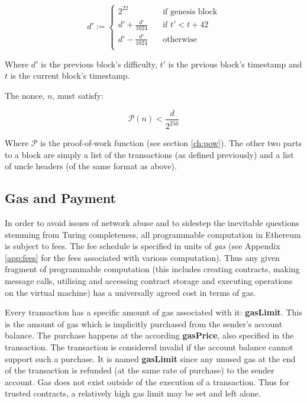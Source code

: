 \documentclass[9pt,oneside]{amsart}
\begin{document}
\begin{multicols}{2}
\begin{equation}
d' :=  \begin{cases}
2^{22} & \quad \text{if genesis block}\\
d' + \frac{d'}{1024} & \quad \text{if $t' < t + 42$}\\
d' - \frac{d'}{1024} & \quad \text{otherwise}\\
\end{cases}
\end{equation}

Where $d'$ is the previous block's difficulty, $t'$ is the prvious block's timestamp and $t$ is the current block's timestamp.

The nonce, $n$, must satisfy:

\begin{equation}
\mathcal{P}(n) < \frac{d}{2^{256}}
\end{equation}

Where $\mathcal{P}$ is the proof-of-work function (see section \ref{ch:pow}). The other two parts to a block are simply a list of the transactions (as defined previously) and a list of uncle headers (of the same format as above).

\subsection{Gas and Payment} \label{ch:payment}

In order to avoid issues of network abuse and to sidestep the inevitable questions stemming from Turing completeness, all programmable computation in Ethereum is subject to fees. The fee schedule is specified in units of \textit{gas} (see Appendix \ref{app:fees} for the fees associated with various computation). Thus any given fragment of programmable computation (this includes creating contracts, making message calls, utilising and accessing contract storage and executing operations on the virtual machine) has a universally agreed cost in terms of gas.

Every transaction has a specific amount of gas associated with it: \textbf{gasLimit}. This is the amount of gas which is implicitly purchased from the sender's account balance. The purchase happens at the according \textbf{gasPrice}, also specified in the transaction. The transaction is considered invalid if the account balance cannot support such a purchase. It is named \textbf{gasLimit} since any unused gas at the end of the transaction is refunded (at the same rate of purchase) to the sender account. Gas does not exist outside of the execution of a transaction. Thus for trusted contracts, a relatively high gas limit may be set and left alone.


\end{multicols}
\end{document}
